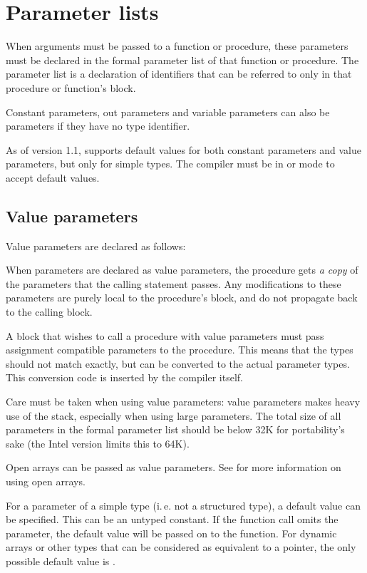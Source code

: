 \section{Parameter lists}
\label{se:Parameters}
When arguments must be passed to a function or procedure, these parameters
must be declared in the formal parameter list of that function or procedure.
The parameter list is a declaration of identifiers that can be referred to
only in that procedure or function's block.

Constant parameters, out parameters and variable parameters can also be 
parameters if they have no type
identifier.

As of version 1.1, \fpc supports default values for both constant parameters
and value parameters, but only for simple types. The compiler must be in
 or  mode to accept default values.

\subsection{Value parameters}
Value parameters are declared as follows:

When parameters are declared as value parameters, the procedure gets {\em
a copy} of the parameters that the calling statement passes. Any modifications
to these parameters are purely local to the procedure's block, and do not
propagate back to the calling block.

A block that wishes to call a procedure with value parameters must pass
assignment compatible parameters to the procedure.
This means that the types
should not match exactly, but can be converted to the actual parameter
types. This conversion code is inserted by the compiler itself.

Care must be taken when using value parameters: value parameters makes heavy
use of the stack, especially when using large parameters. The total size of
all parameters in the formal parameter list should be below 32K for
portability's sake (the Intel version limits this to 64K).

Open arrays can be passed as value parameters. See  for
more information on using open arrays.

For a parameter of a  simple type (i.\,e. not a structured type), a default
value can be specified. This can be an untyped constant. If the function
call omits the parameter, the default value will be passed on to the
function. For dynamic arrays or other types that can be considered as
equivalent to a pointer, the only possible default value is .

